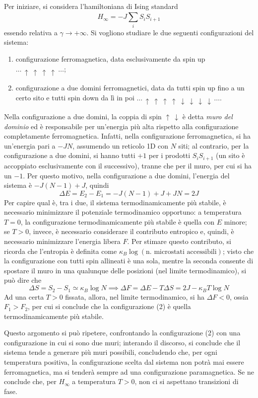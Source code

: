 \documentclass[11pt, a4paper]{scrartcl}
\theoremstyle{style}
\theoremstyle{style1}
\numberwithin{equation}{subsection}
\begin{document}
Per iniziare, si considera l'hamiltoniana di Ising standard 
\[
H_\infty = -J \sum_{i}^{} S_iS_{i+1} 
\] 
essendo relativa a $\gamma\to +\infty$.
Si vogliono studiare le due seguenti configurazioni del sistema:
\begin{enumerate}[(1).]
	\item configurazione ferromagnetica, data esclusivamente da spin up $\ldots\, \uparrow \ \uparrow\ \uparrow\ \uparrow \ \ldots $;
	\item configurazione a due domini ferromagnetici, data da tutti spin up fino a un certo sito e tutti spin down da l\`i in poi $\ldots\, \uparrow \ \uparrow \ \uparrow\ \uparrow \ \downarrow\ \downarrow \ \downarrow\ \downarrow \, \ldots$.
\end{enumerate}
Nella configurazione a due domini, la coppia di spin $\uparrow\ \downarrow$ \`e detta \textit{muro del dominio} ed \`e responsabile per un'energia pi\`u alta rispetto alla configurazione completamente ferromagnetica.
Infatti, nella configurazione ferromagnetica, si ha un'energia pari a $-JN$, assumendo un reticolo 1D con $N$ siti; al contrario, per la configurazione a due domini, si hanno tutti $+1$ per i prodotti $S_i S_{i+1} $ (un sito \`e accoppiato esclusivamente con il successivo), tranne che per il muro, per cui si ha un $-1$. 
Per questo motivo, nella configurazione a due domini, l'energia del sistema \`e $-J(N-1) + J$, quindi 
\[
\Delta E = E_{2} - E_1 = -J(N-1) + J + JN= 2J
\] 
Per capire qual \`e, tra i due, il sistema termodinamicamente pi\`u stabile, \`e necessario minimizzare il potenziale termodinamico opportuno: a temperatura $T=0$, la configurazione termodinamicamente pi\`u stabile \`e quella con $E$ minore; se $T>0$, invece, \`e necessario considerare il contributo entropico e, quindi, \`e necessario minimizzare l'energia libera $F$.
Per stimare questo contributo, si ricorda che l'entropia \`e definita come $\kappa _B \log \left(\text{n. microstati accessibili}\right) $; visto che la configurazione con tutti spin allineati \`e una sola, mentre la seconda consente di spostare il muro in una qualunque delle posizioni (nel limite termodinamico), si pu\`o dire che 
\[
\Delta S = S_{2} -S_1 \simeq \kappa _B \log N \implies \Delta F = \Delta E - T\Delta S = 2J - \kappa _B T \log N
\] 
Ad una certa $T>0$ fissata, allora, nel limite termodinamico, si ha $\Delta F < 0$, ossia $F_1 > F_2$, per cui si conclude che la configurazione (2) \`e quella termodinamicamente pi\`u stabile.

Questo argomento si pu\`o ripetere, confrontando la configurazione (2)	con una configurazione in cui si sono due muri; interando il discorso, si conclude che il sistema tende a generare pi\`u muri possibili, concludendo che, per ogni temperatura positiva, la configurazione scelta dal sistema non potr\`a mai essere ferromagnetica, ma si tender\`a sempre ad una configurazione paramagnetica.
Se ne conclude che, per $H_\infty$ a temperatura $T>0$, non ci si aspettano transizioni di fase.
\end{document}
